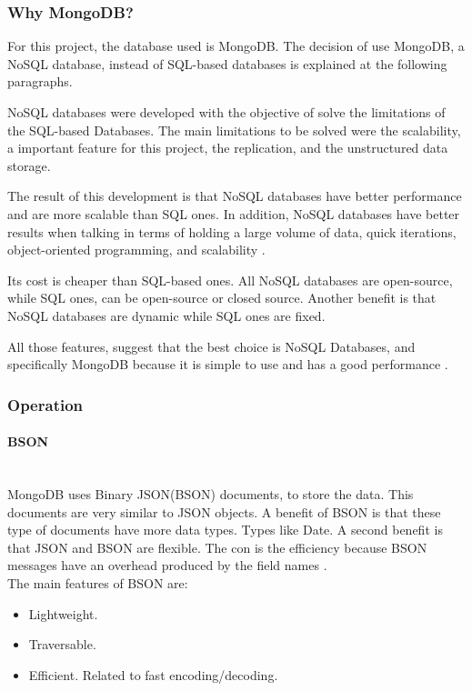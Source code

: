 \documentclass[12pt, a4paper,twoside]{tesi_upf}
\begin{document}
            \subsubsection{Why MongoDB?}
            
            For this project, the database used is MongoDB. The decision of use MongoDB, a NoSQL database, instead of SQL-based databases is explained at the following paragraphs.
            
           NoSQL databases were developed with the objective of solve the limitations of the SQL-based Databases. The main limitations to be solved were the scalability, a important feature for this project, the replication, and the unstructured data storage.
           
           The result of this development is that NoSQL databases have better performance and are more scalable than SQL ones. In addition, NoSQL databases have better results when talking in terms of holding a large volume of data, quick iterations, object-oriented programming, and scalability \cite{nosql}.

        Its cost is cheaper than SQL-based ones. All NoSQL databases are open-source, while SQL ones, can be open-source or closed source. Another benefit is that NoSQL databases are dynamic while SQL ones are fixed.
        
        All those features, suggest that the best choice is NoSQL Databases, and specifically MongoDB because it is simple to use and has a good performance \cite{nosql}.

            \subsubsection{Operation}
            \paragraph{BSON}\\
            MongoDB uses Binary JSON(BSON) documents, to store the data. This documents are very similar to JSON objects. A benefit of BSON is that these type of documents have more data types. Types like Date. A second benefit is that JSON and BSON are flexible. The con is the efficiency because BSON messages have an overhead produced by the field names \cite{bson}.\\
            
            The main features of BSON are:
            \begin{itemize}
            \item Lightweight.
            \item Traversable.
            \item Efficient. Related to fast encoding/decoding.
            \end{itemize}
            
\end{document}

